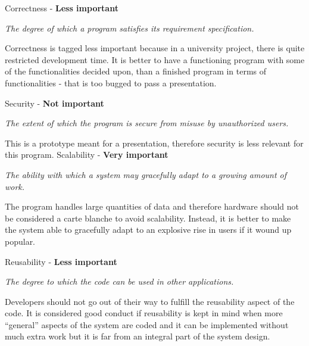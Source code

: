 \vspace{5 mm}
\noindent
Correctness - \textbf{Less important}

\vspace{5 mm}
\noindent
\textit{The degree of which a program satisfies its requirement specification.}

\vspace{5 mm}
\noindent
Correctness is tagged less important because in a university project, there is quite
restricted development time. It is better to have a functioning program with some of the
functionalities decided upon, than a finished program in terms of functionalities - that is
too bugged to pass a presentation.

\vspace{5 mm}
\noindent
Security - \textbf{Not important}

\vspace{5 mm}
\noindent
\textit{The extent of which the program is secure from misuse by unauthorized users.}

\vspace{5 mm}
\noindent
This is a prototype meant for a presentation, therefore security is less
relevant for this program.
\newpage
Scalability - \textbf{Very important}

\vspace{5 mm}
\noindent
\textit{The ability with which a system may gracefully adapt to a growing
amount of work.}

\vspace{5 mm}
\noindent
The program handles large quantities of data and therefore hardware should not be
considered a carte blanche to avoid scalability. Instead, it is better to make
the system able to gracefully adapt to an explosive rise in users if it wound up
popular.

\vspace{5 mm}
\noindent
Reusability - \textbf{Less important}

\vspace{5 mm}
\noindent
\textit{The degree to which the code can be used in other applications.}

\vspace{5 mm}
\noindent
Developers should not go out of their way to fulfill the reusability aspect of
the code. It is considered good conduct if reusability is kept in mind when
more ``general'' aspects of the system are coded and it can be implemented
without much extra work but it is far from an integral part of the system design.

